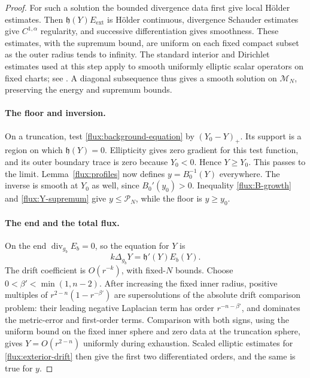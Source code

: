 \begin{proof}
For such a solution the bounded divergence data first give local H\"older
estimates.  Then $\mathfrak h(Y)E_{\mathrm{ext}}$ is H\"older continuous, divergence
Schauder estimates give $C^{1,\alpha}$ regularity, and successive
differentiation gives smoothness.  These estimates, with the supremum
bound, are uniform on each fixed compact subset as the outer radius tends
to infinity.  The standard interior and Dirichlet estimates used at this
step apply to smooth uniformly elliptic scalar operators on fixed charts;
see \cite[Chapters 6 and 8]{GilbargTrudinger2001}.  A diagonal subsequence
thus gives a smooth solution on $\mathcal M_N$, preserving the energy and
supremum bounds.

\paragraph{The floor and inversion.}
On a truncation, test \eqref{flux:background-equation} by
$(Y_0-Y)_+$.  Its support is a region on which $\mathfrak h(Y)=0$.  Ellipticity gives
zero gradient for this test function, and its outer boundary trace is
zero because $Y_0<0$.  Hence $Y\geq Y_0$.  This passes to the limit.
Lemma~\ref{flux:profiles} now defines $y=B_0^{-1}(Y)$ everywhere.  The
inverse is smooth at $Y_0$ as well, since $B_0'(y_0)>0$.  Inequality
\eqref{flux:B-growth} and \eqref{flux:Y-supremum} give
$y\leq\mathcal P_N$, while the floor is $y\geq y_0$.

\paragraph{The end and the total flux.}
On the end $\operatorname{div}_{g_b}E_b=0$, so the equation for $Y$ is
\begin{equation}
 k\Delta_{g_b}Y=\mathfrak h'(Y)E_b(Y).
 \label{flux:exterior-drift}
\end{equation}
The drift coefficient is $O(r^{-k})$, with fixed-$N$ bounds.  Choose
$0<\beta'<\min(1,n-2)$.  After increasing the fixed inner radius, positive
multiples of $r^{2-n}(1-r^{-\beta'})$ are supersolutions of the absolute
drift comparison problem: their leading negative Laplacian term has
order $r^{-n-\beta'}$, and dominates the metric-error and first-order
terms.  Comparison with both signs, using the uniform bound on the fixed
inner sphere and zero data at the truncation sphere, gives
$Y=O(r^{2-n})$ uniformly during exhaustion.  Scaled elliptic estimates
for \eqref{flux:exterior-drift} then give the first two differentiated
orders, and the same is true for $y$.


\end{proof}
